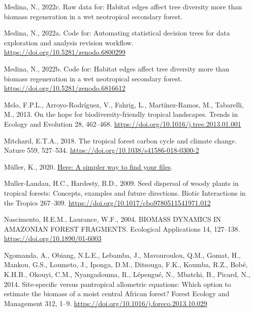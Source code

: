 \documentclass[
  12pt,
]{article}
\newlength{\cslhangindent}
\newlength{\cslentryspacingunit} %
\newenvironment{CSLReferences}[2] %
 {%
  \setlength{\parindent}{0pt}
  \ifodd #1
  \let\oldpar\par
  \def\par{\hangindent=\cslhangindent\oldpar}
  \fi
  \setlength{\parskip}{#2\cslentryspacingunit}
 }%
 {}
\begin{document}
\begin{CSLReferences}{1}{0}
\leavevmode{}%
Medina, N., 2022c. Raw data for: {Habitat} edges affect tree diversity more than biomass regeneration in a wet neotropical secondary forest.

\leavevmode{}%
Medina, N., 2022a. Code for: {Automating} statistical decision trees for data exploration and analysis revision workflow. \url{https://doi.org/10.5281/zenodo.6800299}

\leavevmode{}%
Medina, N., 2022b. Code for: {Habitat} edges affect tree diversity more than biomass regeneration in a wet neotropical secondary forest. \url{https://doi.org/10.5281/zenodo.6816612}

\leavevmode{}%
Melo, F.P.L., Arroyo-Rodríguez, V., Fahrig, L., Martínez-Ramos, M., Tabarelli, M., 2013. On the hope for biodiversity-friendly tropical landscapes. Trends in Ecology and Evolution 28, 462--468. \url{https://doi.org/10.1016/j.tree.2013.01.001}

\leavevmode{}%
Mitchard, E.T.A., 2018. The tropical forest carbon cycle and climate change. Nature 559, 527--534. \url{https://doi.org/10.1038/s41586-018-0300-2}

\leavevmode{}%
Müller, K., 2020. \href{https://CRAN.R-project.org/package=here}{Here: A simpler way to find your files}.

\leavevmode{}%
Muller-Landau, H.C., Hardesty, B.D., 2009. Seed dispersal of woody plants in tropical forests: Concepts, examples and future directions. Biotic Interactions in the Tropics 267--309. \url{https://doi.org/10.1017/cbo9780511541971.012}

\leavevmode{}%
Nascimento, H.E.M., Laurance, W.F., 2004. {BIOMASS DYNAMICS IN AMAZONIAN FOREST FRAGMENTS}. Ecological Applications 14, 127--138. \url{https://doi.org/10.1890/01-6003}

\leavevmode{}%
Ngomanda, A., Obiang, N.L.E., Lebamba, J., Mavouroulou, Q.M., Gomat, H., Mankou, G.S., Loumeto, J., Iponga, D.M., Ditsouga, F.K., Koumba, R.Z., Bobé, K.H.B., Okouyi, C.M., Nyangadouma, R., Lépengué, N., Mbatchi, B., Picard, N., 2014. Site-specific versus pantropical allometric equations: {Which} option to estimate the biomass of a moist central {African} forest? Forest Ecology and Management 312, 1--9. \url{https://doi.org/10.1016/j.foreco.2013.10.029}


\end{CSLReferences}
\end{document}
